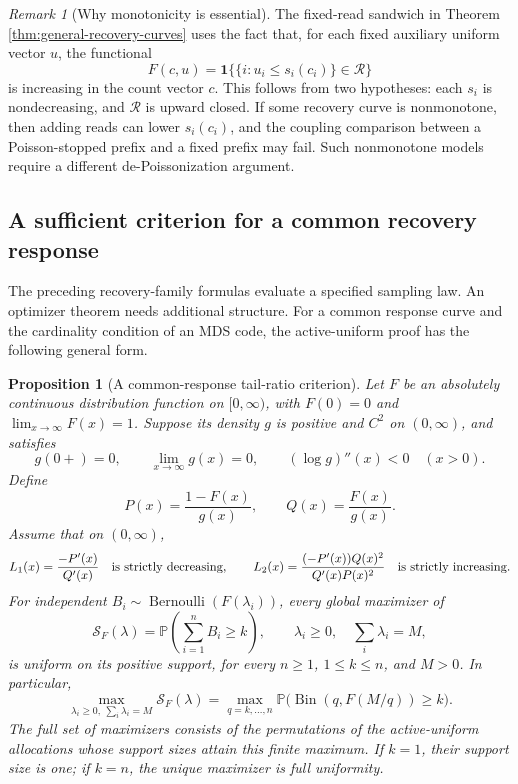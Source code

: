 \documentclass[11pt]{article}
\newtheorem{proposition}{Proposition}
\theoremstyle{definition}
\theoremstyle{remark}
\newtheorem{remark}{Remark}
\DeclareMathOperator{\Bernoulli}{Bernoulli}
\DeclareMathOperator{\Bin}{Bin}
\newcommand{\Pbb}{\mathbb P}
\newcommand{\1}{\mathbf 1}
\begin{document}
\begin{remark}[Why monotonicity is essential]
The fixed-read sandwich in Theorem \ref{thm:general-recovery-curves} uses the fact that, for each fixed auxiliary uniform vector \(u\), the functional
\[
  F(c,u)=\1\{\{i:u_i\le s_i(c_i)\}\in\mathcal R\}
\]
is increasing in the count vector \(c\).  This follows from two hypotheses: each \(s_i\) is nondecreasing, and \(\mathcal R\) is upward closed.  If some recovery curve is nonmonotone, then adding reads can lower \(s_i(c_i)\), and the coupling comparison between a Poisson-stopped prefix and a fixed prefix may fail.  Such nonmonotone models require a different de-Poissonization argument.
\end{remark}

\subsection{A sufficient criterion for a common recovery response}
\label{subsec:common-recovery-criterion}

The preceding recovery-family formulas evaluate a specified sampling
law.  An optimizer theorem needs additional structure.  For a common
response curve and the cardinality condition of an MDS code, the
active-uniform proof has the following general form.

\begin{proposition}[A common-response tail-ratio criterion]
\label{prop:common-recovery-active-uniform}
Let \(F\) be an absolutely continuous distribution function on
\([0,\infty)\), with \(F(0)=0\) and \(\lim_{x\to\infty}F(x)=1\).
Suppose its density \(g\) is positive and \(C^2\) on
\((0,\infty)\), and satisfies
\begin{equation}\label{eq:common-response-density-hypotheses}
  g(0+)=0,\qquad \lim_{x\to\infty}g(x)=0,
  \qquad (\log g)''(x)<0\quad(x>0).
\end{equation}
Define
\[
  P(x)=\frac{1-F(x)}{g(x)},\qquad
  Q(x)=\frac{F(x)}{g(x)}.
\]
Assume that on \((0,\infty)\),
\begin{equation}\label{eq:common-response-slope-hypotheses}
  L_1(x)=\frac{-P'(x)}{Q'(x)}
       \quad\hbox{is strictly decreasing},\qquad
  L_2(x)=\frac{(-P'(x))Q(x)^2}{Q'(x)P(x)^2}
       \quad\hbox{is strictly increasing}.
\end{equation}
For independent \(B_i\sim\Bernoulli(F(\lambda_i))\), every global
maximizer of
\[
  \mathcal S_F(\lambda)
  =\Pbb\left(\sum_{i=1}^n B_i\ge k\right),
  \qquad \lambda_i\ge0,\quad\sum_i\lambda_i=M,
\]
is uniform on its positive support, for every \(n\ge1\),
\(1\le k\le n\), and \(M>0\).  In particular,
\begin{equation}\label{eq:common-response-active-uniform-value}
  \max_{\lambda_i\ge0,\ \sum_i\lambda_i=M}\mathcal S_F(\lambda)
  =\max_{q=k,\ldots,n}
      \Pbb\bigl(\Bin(q,F(M/q))\ge k\bigr).
\end{equation}
The full set of maximizers consists of the permutations of the
active-uniform allocations whose support sizes attain this finite
maximum.  If \(k=1\), their support size is one; if \(k=n\), the
unique maximizer is full uniformity.
\end{proposition}
\end{document}
